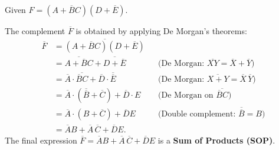 \documentclass[11pt]{article}
\begin{document}
\begin{corrige}
Given \(F = (A + \overline{B}C)(D + \overline{E})\).

The complement \(\overline{F}\) is obtained by applying De Morgan's theorems:
\[
\begin{aligned}
\overline{F} &= \overline{(A + \overline{B}C)(D + \overline{E})} \\
&= \overline{A + \overline{B}C} + \overline{D + \overline{E}} && \text{(De Morgan: } \overline{XY} = \overline{X} + \overline{Y}\text{)} \\
&= \overline{A} \cdot \overline{\overline{B}C} + \overline{D} \cdot \overline{\overline{E}} && \text{(De Morgan: } \overline{X+Y} = \overline{X}\,\overline{Y}\text{)} \\
&= \overline{A} \cdot (\overline{\overline{B}} + \overline{C}) + \overline{D} \cdot E && \text{(De Morgan on } \overline{\overline{B}C}\text{)} \\
&= \overline{A} \cdot (B + \overline{C}) + \overline{D}E && \text{(Double complement: } \overline{\overline{B}} = B\text{)} \\
&= \overline{A}B + \overline{A}\,\overline{C} + \overline{D}E.
\end{aligned}
\]
The final expression \(\overline{F} = \overline{A}B + \overline{A}\,\overline{C} + \overline{D}E\) is a \textbf{Sum of Products (SOP)}.
\end{corrige}
\end{document}
